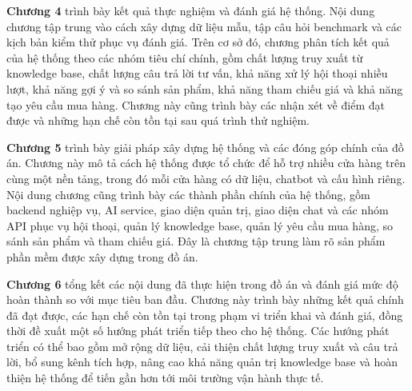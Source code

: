 \documentclass[../DoAn.tex]{subfiles}
\begin{document}
\textbf{Chương 4} trình bày kết quả thực nghiệm và đánh giá hệ thống. Nội dung chương tập trung vào cách xây dựng dữ liệu mẫu, tập câu hỏi benchmark và các kịch bản kiểm thử phục vụ đánh giá. Trên cơ sở đó, chương phân tích kết quả của hệ thống theo các nhóm tiêu chí chính, gồm chất lượng truy xuất từ knowledge base, chất lượng câu trả lời tư vấn, khả năng xử lý hội thoại nhiều lượt, khả năng gợi ý và so sánh sản phẩm, khả năng tham chiếu giá và khả năng tạo yêu cầu mua hàng. Chương này cũng trình bày các nhận xét về điểm đạt được và những hạn chế còn tồn tại sau quá trình thử nghiệm.

\textbf{Chương 5} trình bày giải pháp xây dựng hệ thống và các đóng góp chính của đồ án. Chương này mô tả cách hệ thống được tổ chức để hỗ trợ nhiều cửa hàng trên cùng một nền tảng, trong đó mỗi cửa hàng có dữ liệu, chatbot và cấu hình riêng. Nội dung chương cũng trình bày các thành phần chính của hệ thống, gồm backend nghiệp vụ, AI service, giao diện quản trị, giao diện chat và các nhóm API phục vụ hội thoại, quản lý knowledge base, quản lý yêu cầu mua hàng, so sánh sản phẩm và tham chiếu giá. Đây là chương tập trung làm rõ sản phẩm phần mềm được xây dựng trong đồ án.

\textbf{Chương 6} tổng kết các nội dung đã thực hiện trong đồ án và đánh giá mức độ hoàn thành so với mục tiêu ban đầu. Chương này trình bày những kết quả chính đã đạt được, các hạn chế còn tồn tại trong phạm vi triển khai và đánh giá, đồng thời đề xuất một số hướng phát triển tiếp theo cho hệ thống. Các hướng phát triển có thể bao gồm mở rộng dữ liệu, cải thiện chất lượng truy xuất và câu trả lời, bổ sung kênh tích hợp, nâng cao khả năng quản trị knowledge base và hoàn thiện hệ thống để tiến gần hơn tới môi trường vận hành thực tế.
\end{document}
